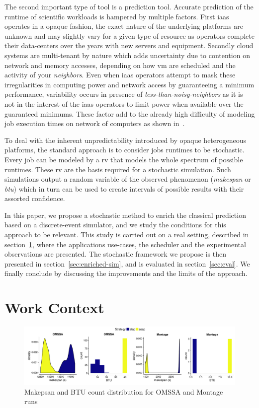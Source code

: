 \documentclass[10pt,conference,compsocconf]{IEEEtran}
\begin{document}
The second important  type of tool is a prediction  tool. Accurate prediction of
the  runtime of  scientific workloads  is  hampered by  multiple factors.  First
\ac{iaas}  operates in  a opaque  fashion, the  exact nature  of the  underlying
platforms are  unknown and  may slightly vary  for a given  type of  resource as
operators  complete their  data-centers  over  the years  with  new servers  and
equipment.   Secondly  cloud  systems  are  multi-tenant  by  nature  which adds
uncertainty due to  contention on network and memory accesses,  depending on how
\ac{vm}  are scheduled  and the  activity of  your \emph{neighbors}.   Even when
\ac{iaas} operators attempt to mask  these irregularities in computing power and
network  access by  guaranteeing a  minimum performance,  variability occurs  in
presence of \emph{less-than-noisy-neighbors} as it is not in the interest of the
\ac{iaas} operators to limit power  when available over the guaranteed minimums.
These factor add to the already  high difficulty of modeling job execution times
on network of computers as shown in~\cite{Lastovetsky05}.

To deal  with the inherent  unpredictability introduced by  opaque heterogeneous
platforms, the standard approach is to  consider jobs runtimes to be stochastic.
Every job can be modeled by a \ac{rv} that models the whole spectrum of possible
runtimes. These  \ac{rv} are  the basis required  for a  stochastic simulation.
Such  simulations   output  a  random   variable  of  the   observed  phenomenon
(\emph{makespan}  or  \emph{\ac{btu}}) which  in  turn  can  be used  to  create
intervals of possible  results with their assorted confidence. 

In this paper, we propose a stochastic method to enrich the classical prediction
based  on a  discrete-event  simulator, and  we study  the  conditions for  this
approach to be relevant. This study is  carried out on a real setting, described
in  section~\ref{sec:work-context},   where  the  applications   use-cases,  the
scheduler  and  the  experimental  observations are  presented.  The  stochastic
framework we propose is  then presented in section~\ref{sec:enriched-sim}, and
is evaluated in section~\ref{sec:eval}. We finally conclude by discussing the 
improvements and the limits of the approach.


\section{Work Context}
\label{sec:work-context}
\begin{figure}
	\centering
	\includegraphics[width=\textwidth]{gfx/real_plot.pdf}
	\caption{Makepsan and BTU count distribution for OMSSA and Montage
	runs\label{fig:realbrs}}
\end{figure}
\end{document}
